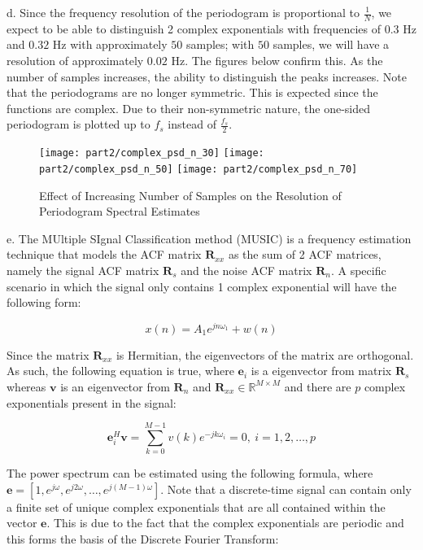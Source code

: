 \noindent{}d. Since the frequency resolution of the periodogram is proportional to $\frac{1}{N}$, we expect to be able to distinguish 2 complex exponentials with frequencies of $0.3$ Hz and $0.32$ Hz with approximately $50$ samples; with $50$ samples, we will have a resolution of approximately $0.02$ Hz. The figures below confirm this. As the number of samples increases, the ability to distinguish the peaks increases. Note that the periodograms are no longer symmetric. This is expected since the functions are complex. Due to their non-symmetric nature, the one-sided periodogram is plotted up to $f_s$ instead of $\frac{f_s}{2}$.

\begin{figure}[H]
\centering{}
\texttt{[image: part2/complex\_psd\_n\_30]}
\texttt{[image: part2/complex\_psd\_n\_50]}
\texttt{[image: part2/complex\_psd\_n\_70]}
\caption{Effect of Increasing Number of Samples on the Resolution of Periodogram Spectral Estimates}
\label{fig:complex_periodogram}
\end{figure}

\newpage
\noindent{}e. The MUltiple SIgnal Classification method (MUSIC) is a frequency estimation technique that models the ACF matrix $\textbf{R}_{xx}$ as the sum of 2 ACF matrices, namely the signal ACF matrix $\textbf{R}_s$ and the noise ACF matrix $\textbf{R}_n$. A specific scenario in which the signal only contains 1 complex exponential will have the following form:

\begin{equation}
x(n) = A_1 e^{jn\omega_1} + w(n)
\end{equation}

\noindent{}Since the matrix $\textbf{R}_{xx}$ is Hermitian, the eigenvectors of the matrix are orthogonal. As such, the following equation is true, where $\textbf{e}_{i}$ is a eigenvector from matrix $\textbf{R}_s$ whereas $\textbf{v}$ is an eigenvector from $\textbf{R}_n$ and $\textbf{R}_{xx} \in \mathbb{R}^{M \times M}$ and there are $p$ complex exponentials present in the signal:

\begin{equation}
\textbf{e}_{i}^H \textbf{v} = \sum_{k=0}^{M-1} v(k)e^{-jk\omega_{i}} = 0, \ i=1,2,\dots,p
\end{equation}

\noindent{}The power spectrum can be estimated using the following formula, where $\textbf{e} = [1, e^{j\omega}, e^{j2\omega},\dots, e^{j(M-1)\omega}]$. Note that a discrete-time signal can contain only a finite set of unique complex exponentials that are all contained within the vector $\textbf{e}$. This is due to the fact that the complex exponentials are periodic and this forms the basis of the Discrete Fourier Transform:


